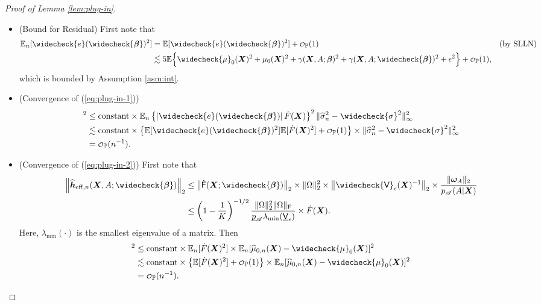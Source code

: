 \documentclass[11pt]{article}
\numberwithin{equation}{section}
\theoremstyle{definition}
\theoremstyle{remark}
\newcommand{\bh}{\bm{h}}
\newcommand{\bX}{\bm{X}}
\newcommand{\bbeta}{\bm{\beta}}
\newcommand{\bomega}{\bm{\omega}}
\newcommand{\bbE}{\mathbb{E}}
\newcommand{\bbP}{\mathbb{P}}
\newcommand{\sA}{\mathscr{A}}
\newcommand{\sfF}{\mathsf{F}}
\newcommand{\sfV}{\mathsf{V}}
\newcommand\smallcO{
	\mathchoice
	{{\scriptstyle\mathcal{O}}}%
	{{\scriptstyle\mathcal{O}}}%
	{{\scriptscriptstyle\mathcal{O}}}%
	{\scalebox{.5}{$\scriptscriptstyle\mathcal{O}$}}%
}
\def\ubar#1{\underbar{$ #1 $}}
\newcommand{\eff}{\mathrm{eff}}
\begin{document}
\begin{proof}[Proof of Lemma \ref{lem:plug-in}]
\begin{itemize}[leftmargin=*]
		\item (Bound for Residual) First note that
		\begin{align*}
			\bbE_{n}[\widecheck{e}(\widecheck{\bbeta})^{2}] &= \bbE[\widecheck{e}(\widecheck{\bbeta})^{2}] + \smallcO_{\bbP}(1) &&(\text{by SLLN})\\
			&\lesssim 5\bbE\Big\{ \widecheck{\mu}_{0}(\bX)^{2} + \mu_{0}(\bX)^{2} + \gamma(\bX,A;\bbeta)^{2} + \gamma(\bX,A;\widecheck{\bbeta})^{2} + \epsilon^{2} \Big\} + \smallcO_{\bbP}(1),
		\end{align*}
		which is bounded by Assumption \ref{asm:int}.
		
		\item (Convergence of (\ref{eq:plug-in-1}))
		\begin{align*}
			[\bbE_{n}\|(\ref{eq:plug-in-1})\|_{2}]^{2} &\le \text{constant} \times \bbE_{n}\left\{ \left| \widecheck{e}(\widecheck{\bbeta}) \right| \dot{F}(\bX) \right\}^{2} \| \widehat{\sigma}_{n}^{2} - \widecheck{\sigma}^{2} \|_{\infty}^{2}\\
			&\lesssim \text{constant} \times \left\{ \bbE[\widecheck{e}(\widecheck{\bbeta})^{2}]\bbE[\dot{F}(\bX)^{2}] + \smallcO_{\bbP}(1) \right\} \times \| \widehat{\sigma}_{n}^{2} - \widecheck{\sigma}^{2} \|_{\infty}^{2} \\
			&= \smallcO_{\bbP}(n^{-1}).
		\end{align*}
		
		\item (Convergence of (\ref{eq:plug-in-2})) First note that
		\begin{align}
			\left \| \widehat{\bh}_{\eff,n}(\bX,A;\widecheck{\bbeta}) \right \|_{2} &\le \left \| \dot{\sfF}(\bX;\widecheck{\bbeta}) \right \|_{2} \times \| \Omega \|_{2}^{2} \times \left \| \widecheck{\sfV}_{\epsilon}(\bX)^{-1} \right \|_{2} \times {\| \bomega_{A} \|_{2} \over p_{\sA}(A|\bX)} \nonumber \\
			&\le \left( 1 - {1 \over K} \right)^{-1/2}{\| \Omega \|_{2}^{2}\| \Omega \|_{\rm F} \over \ubar{p}_{\sA} \lambda_{\min}(\ubar{\sfV}_{\epsilon})} \times \dot{F}(\bX).\label{eq:instrument_bdd}
		\end{align}
		Here, $ \lambda_{\min}(\cdot) $ is the smallest eigenvalue of a matrix. Then
		\begin{align*}
			[\bbE_{n}\| (\ref{eq:plug-in-2}) \|_{2}]^{2} &\le \text{constant} \times \bbE_{n}[\dot{F}(\bX)^{2}] \times \bbE_{n}[\widehat{\mu}_{0,n}(\bX) - \widecheck{\mu}_{0}(\bX)]^{2} \\
			&\lesssim \text{constant} \times \left\{  \bbE[\dot{F}(\bX)^{2}] + \smallcO_{\bbP}(1) \right\} \times \bbE_{n}[\widehat{\mu}_{0,n}(\bX) - \widecheck{\mu}_{0}(\bX)]^{2} \\
			&= \smallcO_{\bbP}(n^{-1}).
		\end{align*}
		

\end{itemize}
\end{proof}
\end{document}
